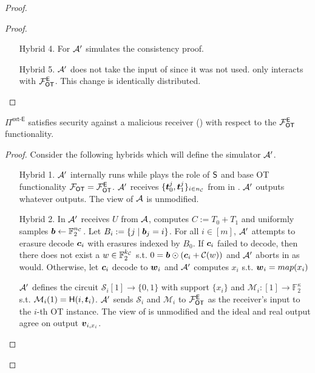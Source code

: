 \begin{proof}
\begin{proof}
\begin{enumerate}[leftmargin=0.6cm,itemindent=30pt]
			\item[Hybrid 4.] For  $\mathcal{A}'$ simulates the consistency proof.
			
			\item[Hybrid 5.] $\mathcal{A}'$ does not take the input of \rec since it was not used. \rec only interacts with $\mathcal{F}_{\mathsf{OT}}^\mathsf{E}$. This change is identically distributed.
		\end{enumerate}
		\pe
	\end{proof}

	\begin{claim}\label{claim:ext-E-MalReceiver}
	$\Pi^\textsf{ext-E}$ satisfies security against a malicious receiver () with respect to the $\mathcal{F}_{\mathsf{OT}}^\mathsf{E}$ functionality.
	\end{claim}
	\begin{proof}
				Consider the following hybrids which will define the simulator $\mathcal{A}'$. 
		\begin{enumerate}[leftmargin=0.6cm,itemindent=30pt]
			\item[Hybrid 1.] $\mathcal{A}'$ internally runs \Adv while plays the role of $\mathsf{S}$ and base OT functionality $\mathcal{F}_{\mathsf{OT}}=\mathcal{F}_{\mathsf{OT}}^\mathsf{E}$. $\mathcal{A}'$ receives $\{\boldsymbol{t}^j_0,\boldsymbol{t}^j_1\}_{i\in{n_\mathcal{C}}}$ from \Adv in . $\mathcal{A}'$ outputs whatever \Adv outputs. The view of $\mathcal{A}$ is unmodified.
			
			\item[Hybrid 2.] In  $\mathcal{A}'$ receives $U$ from $\mathcal{A}$, computes $C:=T_0+T_1$ and uniformly samples $\boldsymbol{b}\gets\mathbb{F}^{{n_\mathcal{C}}}_2$. Let  $B_i:=\{j \mid \boldsymbol{b}_j = i\}$. For all $i\in[m]$, $\mathcal{A}'$ attempts to erasure decode $\boldsymbol{c}_i$ with erasures indexed by $B_0$. If $\boldsymbol{c}_i$ failed to decode, then there does not exist a $w\in\mathbb{F}^{{k_\mathcal{C}}}_2$ s.t. $0=\boldsymbol{b}\odot (\boldsymbol{c}_i+\mathcal{C}(w))$ and $\mathcal{A}'$ aborts in  as \send would. Otherwise, let $\boldsymbol{c}_i$ decode to $\boldsymbol{w}_i$ and $\mathcal{A}'$ computes $x_i$ s.t. $\boldsymbol{w}_i=map(x_i)$
			
			
			$\mathcal{A}'$ defines the circuit $\mathcal{S}_i[1]\rightarrow\{0,1\}$ with support $\{x_i\}$ and $\mathcal{M}_i:[1]\rightarrow\mathbb{F}^\kappa_2$ s.t. $\mathcal{M}_i(1)=\mathsf{H}(i, \boldsymbol{t}_i)$. $\mathcal{A}'$ sends $\mathcal{S}_i$ and $\mathcal{M}_i$ to $\mathcal{F}_{\mathsf{OT}}^\mathsf{E}$ as the receiver's input to the $i$-th OT instance. The view of \Adv is unmodified and the ideal and real output agree on output $\boldsymbol{v}_{i,x_i}$.
			

\end{enumerate}
\end{proof}
\end{proof}
